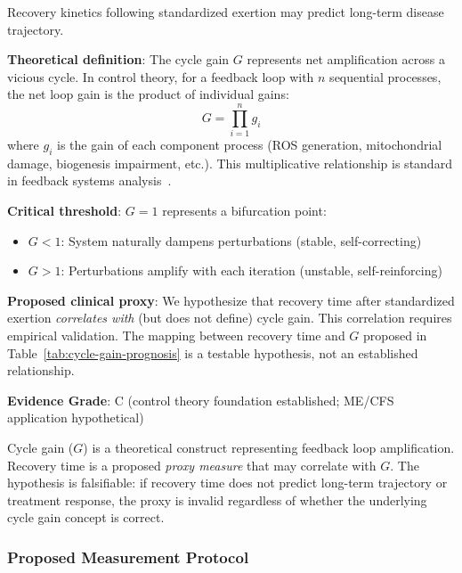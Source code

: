 \begin{hypothesis}
Recovery kinetics following standardized exertion may predict long-term disease trajectory.

\textbf{Theoretical definition}: The cycle gain $G$ represents net amplification across a vicious cycle. In control theory, for a feedback loop with $n$ sequential processes, the net loop gain is the product of individual gains:
$$G = \prod_{i=1}^{n} g_i$$
where $g_i$ is the gain of each component process (ROS generation, mitochondrial damage, biogenesis impairment, etc.). This multiplicative relationship is standard in feedback systems analysis~\cite{Alon2006systems}.

\textbf{Critical threshold}: $G = 1$ represents a bifurcation point:
\begin{itemize}
    \item $G < 1$: System naturally dampens perturbations (stable, self-correcting)
    \item $G > 1$: Perturbations amplify with each iteration (unstable, self-reinforcing)
\end{itemize}

\textbf{Proposed clinical proxy}: We hypothesize that recovery time after standardized exertion \textit{correlates with} (but does not define) cycle gain. This correlation requires empirical validation. The mapping between recovery time and $G$ proposed in Table~\ref{tab:cycle-gain-prognosis} is a testable hypothesis, not an established relationship.

\textbf{Evidence Grade}: C (control theory foundation established; ME/CFS application hypothetical)
\end{hypothesis}

\begin{warning}
Cycle gain ($G$) is a theoretical construct representing feedback loop amplification. Recovery time is a proposed \textit{proxy measure} that may correlate with $G$. The hypothesis is falsifiable: if recovery time does not predict long-term trajectory or treatment response, the proxy is invalid regardless of whether the underlying cycle gain concept is correct.
\end{warning}

\subsubsection{Proposed Measurement Protocol}


